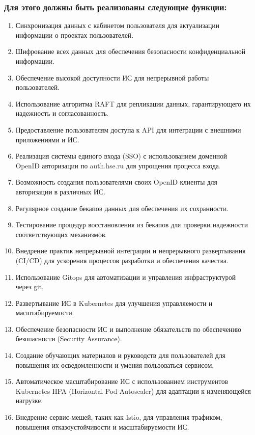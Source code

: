 \documentclass[14pt, a4paper]{extarticle}
\begin{document}
\subsubsection*{Для этого должны быть реализованы следующие функции:}

\begin{enumerate}
\item Синхронизация данных с кабинетом пользователя для актуализации информации о проектах пользователей.
\item Шифрование всех данных для обеспечения безопасности конфиденциальной информации.
\item Обеспечение высокой доступности ИС для непрерывной работы пользователей.
\item Использование алгоритма RAFT для репликации данных, гарантирующего их надежность и согласованность.
\item Предоставление пользователям доступа к API для интеграции с внешними приложениями и ИС.
\item Реализация системы единого входа (SSO) с использованием доменной OpenID авторизации по auth.hse.ru для упрощения процесса входа.
\item Возможность создания пользователями своих OpenID клиенты для авторизации в различных ИС.
\item Регулярное создание бекапов данных для обеспечения их сохранности.
\item Тестирование процедур восстановления из бекапов для проверки надежности соответствующих механизмов.
\item Внедрение практик непрерывной интеграции и непрерывного развертывания (CI/CD) для ускорения процессов разработки и обеспечения качества.
\item Использование Gitops для автоматизации и управления инфраструктурой через git.
\item Развертывание ИС в Kubernetes для улучшения управляемости и масштабируемости.
\item Обеспечение безопасности ИС и выполнение обязательств по обеспечению безопасности (Security Assurance).
\item Создание обучающих материалов и руководств для пользователей для повышения их осведомленности и умения пользоваться сервисом.
\item Автоматическое масштабирование ИС с использованием инструментов Kubernetes HPA (Horizontal Pod Autoscaler) для адаптации к изменяющейся нагрузке.
\item Внедрение сервис-мешей, таких как Istio, для управления трафиком, повышения отказоустойчивости и масштабируемости ИС.
\end{enumerate}
\end{document}
